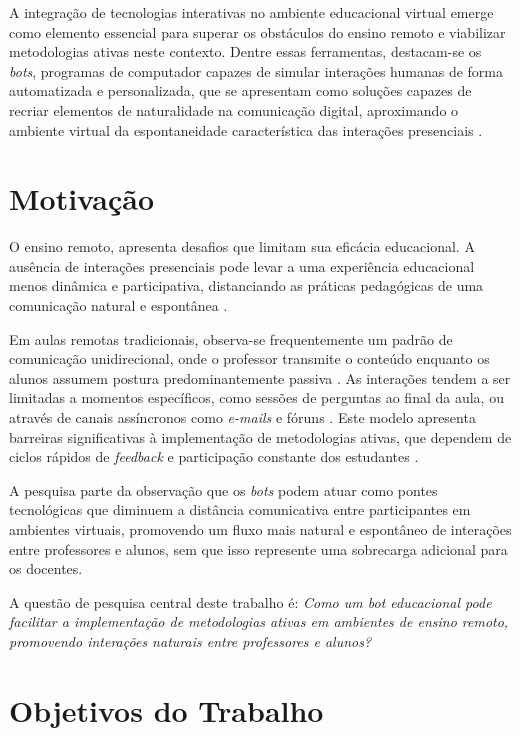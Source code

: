 A integração de tecnologias interativas no ambiente educacional virtual emerge
como elemento essencial para superar os obstáculos do ensino remoto e viabilizar
metodologias ativas neste contexto. Dentre essas ferramentas, destacam-se os
\textit{bots}, programas de computador capazes de simular interações humanas de
forma automatizada e personalizada, que se apresentam como soluções capazes de
recriar elementos de naturalidade na comunicação digital, aproximando o ambiente
virtual da espontaneidade característica das interações presenciais
\cite{okonkwo2021}.

\section{Motivação}
\label{sec:motivacao}

O ensino remoto, apresenta desafios que limitam sua eficácia educacional. A
ausência de interações presenciais pode levar a uma experiência educacional
menos dinâmica e participativa, distanciando as práticas pedagógicas de uma
comunicação natural e espontânea \cite{fabiane2024}.

Em aulas remotas tradicionais, observa-se frequentemente um padrão de comunicação
unidirecional, onde o professor transmite o conteúdo enquanto os alunos assumem
postura predominantemente passiva \cite{hodges2020}. As interações tendem a ser
limitadas a momentos específicos, como sessões de perguntas ao final da aula, ou
através de canais assíncronos como \textit{e-mails} e fóruns \cite{fabiane2024}.
Este modelo apresenta barreiras significativas à implementação de metodologias
ativas, que dependem de ciclos rápidos de \textit{feedback} e participação
constante dos estudantes \cite{prince2004}.

A pesquisa parte da observação que os \textit{bots} podem atuar como pontes
tecnológicas que diminuem a distância comunicativa entre participantes em
ambientes virtuais, promovendo um fluxo mais natural e espontâneo de interações
entre professores e alunos, sem que isso represente uma sobrecarga adicional
para os docentes. \cite{winkler2018,okonkwo2021,zawacki2019}

A questão de pesquisa central deste trabalho é: \textit{Como um \textit{bot}
educacional pode facilitar a implementação de metodologias ativas em ambientes
de ensino remoto, promovendo interações naturais entre professores e alunos?}

\section{Objetivos do Trabalho} \label{sec:objetivos}

